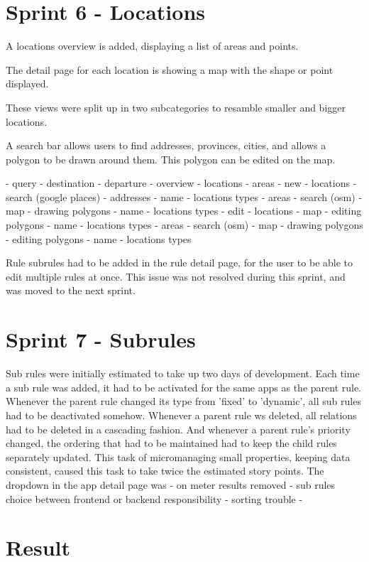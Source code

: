 %
\section{Sprint 6 - Locations}
A locations overview is added, displaying a list of areas and points.

The detail page for each location is showing a map with the shape or point displayed.

These views were split up in two subcategories to resamble smaller and bigger locations.

A search bar allows users to find addresses, provinces, cities, and allows a polygon to be drawn around them. This polygon can be edited on the map.

- query
	- destination
	- departure
- overview
	- locations
	- areas
- new
	- locations
		- search (google places)
		- addresses
		- name
		- locations types
	- areas
		- search (osm)
		- map
			- drawing polygons
		- name
		- locations types
- edit
	- locations
		- map
		  - editing polygons
		- name
		- locations types
	- areas
		- search (osm)
		- map
			- drawing polygons
			- editing polygons
		- name
		- locations types

Rule subrules had to be added in the rule detail page, for the user to be able to edit multiple rules at once. This issue was not resolved during this sprint, and was moved to the next sprint.

%
\section{Sprint 7 - Subrules}
Sub rules were initially estimated to take up two days of development. Each time a sub rule was added, it had to be activated for the same apps as the parent rule. Whenever the parent rule changed its type from 'fixed' to 'dynamic', all sub rules had to be deactivated somehow. Whenever a parent rule ws deleted, all relations had to be deleted in a cascading fashion. And whenever a parent rule's priority changed, the ordering that had to be maintained had to keep the child rules separately updated. This task of micromanaging small properties, keeping data consistent, caused this task to take twice the estimated story points. The dropdown in the app detail page was
- on meter results removed
- sub rules choice between frontend or backend responsibility
- sorting trouble
-


%
\section{Result}
